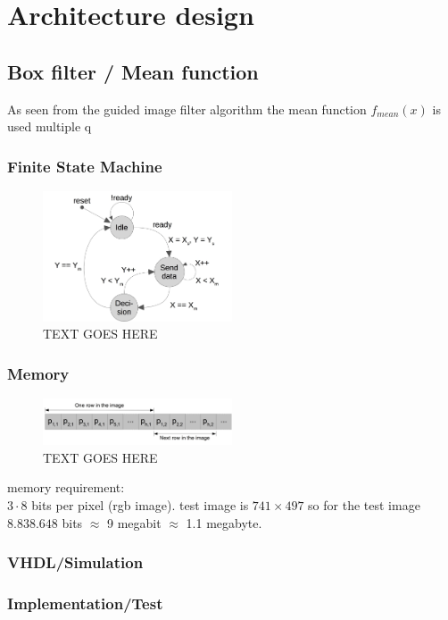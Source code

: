 \chapter{Architecture design}

\section{Box filter / Mean function}
As seen from the guided image filter algorithm the mean function $f_{mean}(x)$ is used multiple q

\subsection{Finite State Machine}
\begin{figure}
  \centering
  \includegraphics[width=0.5\textwidth]{figures/meanFSMv1.jpg}
  \caption{TEXT GOES HERE}
  \label{fig:LABEL}
\end{figure}

\subsection{Memory}
\begin{figure}
  \centering
  \includegraphics[width=0.5\textwidth]{figures/memdata.jpg}
  \caption{TEXT GOES HERE}
  \label{fig:LABEL}
\end{figure}

memory requirement: \\
$3 \cdot 8$ bits per pixel (rgb image). test image is $741 \times 497$ so for the test image $8.838.648$ bits $\approx$ 9 megabit $\approx$ 1.1 megabyte.

\subsection{VHDL/Simulation}

\subsection{Implementation/Test}

